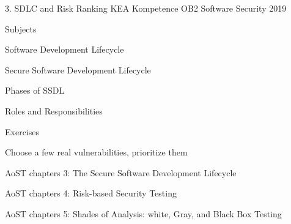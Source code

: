 \documentclass[Screen16to9,17pt]{foils}
\begin{document}
\mytitlepage
{3. SDLC and Risk Ranking}
{KEA Kompetence OB2 Software Security 2019}


\begin{list1}
\item Subjects
\begin{list2}
\item Software Development Lifecycle
\item Secure Software Development Lifecycle
\item Phases of SSDL
\item Roles and Responsibilities
\end{list2}
\item Exercises
\begin{list2}
\item Choose a few real vulnerabilities, prioritize them
\end{list2}
\end{list1}


\begin{list1}
\item AoST chapters 3: The Secure Software Development Lifecycle
\item AoST chapters 4: Risk-based Security Testing
\item AoST chapters 5: Shades of Analysis: white, Gray, and Black Box Testing
\end{list1}



\begin{list1}
\item
\end{list1}



\end{document}

